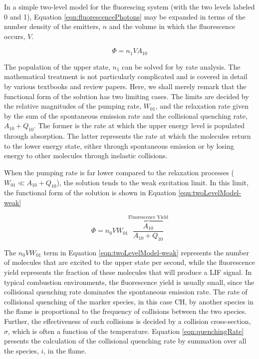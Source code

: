 In a simple two-level model for the fluorescing system (with the two levels labeled 0 and 1), Equation \ref{eqn:fluorescencePhotons} may be expanded in terms of the number density of the emitters, \(n\) and the volume in which the fluorescence occurs, \(V\).

\begin{equation}
  \Phi = n_1VA_{10}
\end{equation}

The population of the upper state, \(n_1\) can be solved for by rate analysis.
The mathematical treatment is not particularly complicated and is covered in detail by various textbooks and review papers.\cite{1997-daily}
Here, we shall merely remark that the functional form of the solution has two limiting cases.
The limits are decided by the relative magnitudes of the pumping rate, \(W_{01}\), and the relaxation rate given by the sum of the spontaneous emission rate and the collisional quenching rate, \(A_{10} + Q_{10}\).
The former is the rate at which the upper energy level is populated through absorption.
The latter represents the rate at which the molecules return to the lower energy state, either through spontaneous emission or by losing energy to other molecules through inelastic collisions.

When the pumping rate is far lower compared to the relaxation processes (\(W_{01}\ll A_{10}+Q_{10}\)), the solution tends to the weak excitation limit.
In this limit, the functional form of the solution is shown in Equation \ref{eqn:twoLevelModel-weak}

\begin{equation}
  \Phi = n_0 V W_{01}\overbrace{\frac{A_{10}}{A_{10}+Q_{10}}}^{\text{Fluorescence Yield}}
  \label{eqn:twoLevelModel-weak}
\end{equation}

The \(n_0VW_{01}\) term in Equation \ref{eqn:twoLevelModel-weak} represents the number of molecules that are excited to the upper state per second, while the fluorescence yield represents the fraction of these molecules that will produce a LIF signal.
In typical combustion environments, the fluorescence yield is usually small, since the collisional quenching rate dominates the spontaneous emission rate.
The rate of collisional quenching of the marker species, in this case CH, by another species in the flame is proportional to the frequency of collisions between the two species.
Further, the effectiveness of such collisions is decided by a collision cross-section, \(\sigma\), which is often a function of the temperature.
Equation \ref{eqn:quenchingRate} presents the calculation of the collisional quenching rate by summation over all the species, \(i\), in the flame.

